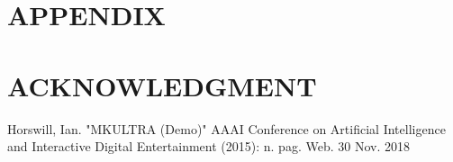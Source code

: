 \documentclass[letterpaper, 10 pt, conference]{ieeeconf}  %
\begin{document}






\section*{APPENDIX}

\section*{ACKNOWLEDGMENT}










\begin{thebibliography}{99}

 Horswill, Ian. "MKULTRA (Demo)" AAAI Conference on Artificial Intelligence and Interactive Digital Entertainment (2015): n. pag. Web. 30 Nov. 2018



\end{thebibliography}
\end{document}
